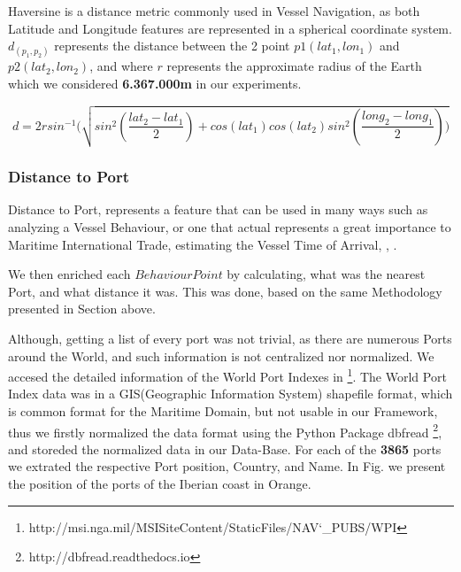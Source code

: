 Haversine is a distance metric commonly used in Vessel Navigation, as both Latitude and Longitude features are represented in a spherical coordinate system. $d_({p_1}, {p_2})$ represents the distance between the 2 point $p1(lat_1, lon_1)$ and $p2(lat_2, lon_2)$, and where $r$ represents the approximate radius of the Earth which we considered \textbf{6.367.000m} in our experiments.

\begin{equation}
d = 2r sin ^{-1} (\sqrt{sin^2(\frac{lat_{2}-lat_{1}}{2})+cos(lat_{1})cos(lat_{2})sin^2(\frac{long_{2}-long_{1}}{2}))}
\label{eq: Haversine}
\end{equation}

\subsubsection{Distance to Port}
Distance to Port, represents a feature that can be used in many ways such as  analyzing a Vessel Behaviour, or one that actual represents a great importance to Maritime International Trade, estimating the Vessel Time of Arrival,  \cite{Moussa2018ScalableSpark}, \cite{Rosca2018PredictingRoutes}.
 
We then enriched each $Behaviour Point$ by calculating, what was the nearest Port, and what distance it was. This was done, based on the same Methodology presented in Section above. 

Although, getting a list of every port was not trivial, as there are numerous Ports around the World, and such information is not 
centralized nor normalized.
We accesed the detailed information of the World Port Indexes in \footnote{http://msi.nga.mil/MSISiteContent/StaticFiles/NAV\char`_PUBS/WPI}. The World Port Index data was in a GIS(Geographic Information System) shapefile format, which is common format for the Maritime Domain, but not usable in our Framework, thus we firstly normalized the data format using the Python Package dbfread \footnote{http://dbfread.readthedocs.io}, and storeded the normalized data in our Data-Base. 
For each of the \textbf{3865} ports we extrated the respective Port position, Country, and Name. 
In Fig. we present the position of the ports of the Iberian coast in Orange.

